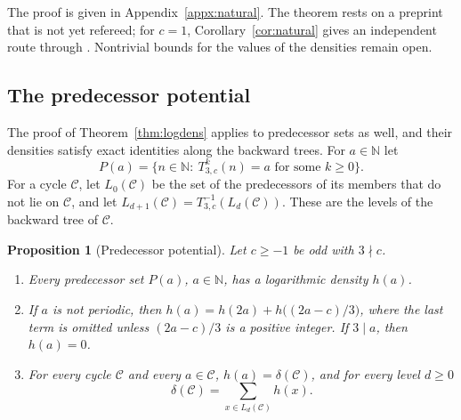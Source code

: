 \documentclass[12pt]{amsart}
\newtheorem{proposition}{Proposition}
\theoremstyle{definition}
\theoremstyle{remark}
\newcommand{\N}{\mathbb{N}}
\begin{document}
The proof is given in Appendix~\ref{appx:natural}. The theorem rests on a preprint that is not yet refereed; for $c=1$, Corollary~\ref{cor:natural} gives an independent route through \cite{Mazur_2026}. Nontrivial bounds for the values of the densities remain open.

\subsection*{The predecessor potential}
The proof of Theorem~\ref{thm:logdens} applies to predecessor sets as well, and their densities satisfy exact identities along the backward trees. For $a\in\N$ let
\[
P(a)=\{n\in\N:\ T_{3,c}^k(n)=a\text{ for some }k\ge0\}.
\]
For a cycle $\mathcal C$, let $L_0(\mathcal C)$ be the set of the predecessors of its members that do not lie on $\mathcal C$, and let $L_{d+1}(\mathcal C)=T_{3,c}^{-1}(L_d(\mathcal C))$. These are the levels of the backward tree of $\mathcal C$.

\begin{proposition}[Predecessor potential]
\label{prop:potential}
Let $c\ge-1$ be odd with $3\nmid c$.
\begin{enumerate}[label=(\alph*)]
	\item Every predecessor set $P(a)$, $a\in\N$, has a logarithmic density $h(a)$.
	\item If $a$ is not periodic, then $h(a)=h(2a)+h\bigl((2a-c)/3\bigr)$, where the last term is omitted unless $(2a-c)/3$ is a positive integer. If $3\mid a$, then $h(a)=0$.
	\item For every cycle $\mathcal C$ and every $a\in\mathcal C$, $h(a)=\delta(\mathcal C)$, and for every level $d\ge0$
	\[
	\delta(\mathcal C)=\sum_{x\in L_d(\mathcal C)}h(x).
	\]
\end{enumerate}
\end{proposition}
\end{document}
